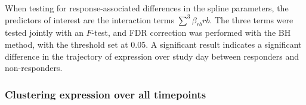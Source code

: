 When testing for response-associated differences in the spline parameters, 
the predictors of interest are the interaction terms $\sum_{}^{3}{\beta_{rb} rb}$. 
The three terms were tested jointly with an $F$-test, and \gls{FDR} correction was performed with the \gls{BH} method, with the threshold set at 0.05.
A significant result indicates a significant difference in the trajectory of expression over study day between responders and non-responders.

\subsubsection{Clustering expression over all timepoints}

